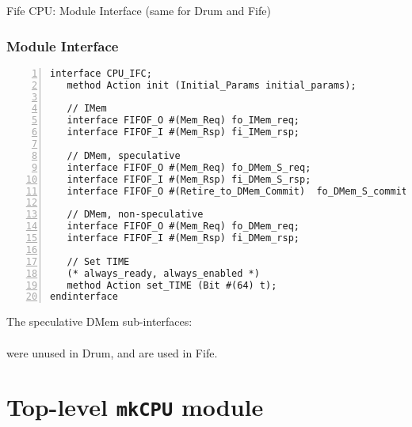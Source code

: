 \begin{frame}

\begin{center}
  {\LARGE Fife CPU: Module Interface (same for Drum and Fife)}
\end{center}

\end{frame}


\begin{frame}[fragile]
\frametitle{Module Interface}

\footnotesize


{\scriptsize
\begin{Verbatim}[frame=single, numbers=left, label=src\_Common/CPU\_IFC.bsv: line 27 ...]
interface CPU_IFC;
   method Action init (Initial_Params initial_params);

   // IMem
   interface FIFOF_O #(Mem_Req) fo_IMem_req;
   interface FIFOF_I #(Mem_Rsp) fi_IMem_rsp;

   // DMem, speculative
   interface FIFOF_O #(Mem_Req) fo_DMem_S_req;
   interface FIFOF_I #(Mem_Rsp) fi_DMem_S_rsp;
   interface FIFOF_O #(Retire_to_DMem_Commit)  fo_DMem_S_commit;

   // DMem, non-speculative
   interface FIFOF_O #(Mem_Req) fo_DMem_req;
   interface FIFOF_I #(Mem_Rsp) fi_DMem_rsp;

   // Set TIME
   (* always_ready, always_enabled *)
   method Action set_TIME (Bit #(64) t);
endinterface
\end{Verbatim}
}

\vspace{1ex}

The speculative DMem sub-interfaces: \\
   \\
were unused in Drum, and are used in Fife.

\end{frame}


\section{Top-level {\tt mkCPU} module}

